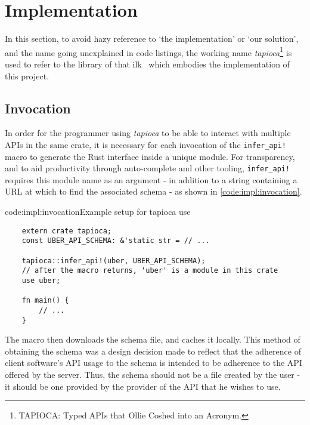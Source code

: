 \section{Implementation} \label{impl}

In this section, to avoid hazy reference to `the implementation' or `our solution', and the name going unexplained in code listings, the working name \emph{tapioca}\footnote{TAPIOCA: Typed APIs that Ollie Coshed into an Acronym.} is used to refer to the library of that ilk~\cite{tapioca} which embodies the implementation of this project.



\subsection{Invocation} \label{impl:invocation}

In order for the programmer using \emph{tapioca} to be able to interact with multiple APIs in the same crate, it is necessary for each invocation of the \texttt{infer_api!} macro to generate the Rust interface inside a unique module. For transparency, and to aid productivity through auto-complete and other tooling, \texttt{infer_api!} requires this module name as an argument - in addition to a string containing a URL at which to find the associated schema - as shown in \cref{code:impl:invocation}.

\begin{codelisting}{code:impl:invocation}{Example setup for tapioca use}
\begin{spacing}{\codespacing}
\begin{verbatim}
    extern crate tapioca;
    const UBER_API_SCHEMA: &'static str = // ...
    
    tapioca::infer_api!(uber, UBER_API_SCHEMA);
    // after the macro returns, 'uber' is a module in this crate
    use uber;
    
    fn main() {
        // ...
    }
\end{verbatim}
\end{spacing}
\end{codelisting}

The macro then downloads the schema file, and caches it locally. This method of obtaining the schema was a design decision made to reflect that the adherence of client software's API usage to the schema is intended to be adherence to the API offered by the server. Thus, the schema should not be a file created by the user - it should be one provided by the provider of the API that he wishes to use.

